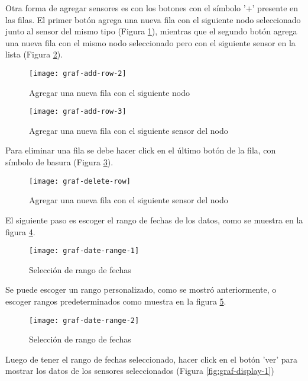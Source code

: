 Otra forma de agregar sensores es con los botones con el símbolo '+' presente en las filas. El primer botón agrega una nueva fila con el siguiente nodo seleccionado junto al sensor del mismo tipo (Figura \ref{fig:graf-add-row-2}), mientras que el segundo botón agrega una nueva fila con el mismo nodo seleccionado pero con el siguiente sensor en la lista (Figura \ref{fig:graf-add-row-3}).

\begin{figure}[H]
	\centering
	\texttt{[image: graf-add-row-2]}
	\caption{\label{fig:graf-add-row-2} Agregar una nueva fila con el siguiente nodo}
\end{figure}

\begin{figure}[H]
	\centering
	\texttt{[image: graf-add-row-3]}
	\caption{\label{fig:graf-add-row-3} Agregar una nueva fila con el siguiente sensor del nodo}
\end{figure}

Para eliminar una fila se debe hacer click en el último botón de la fila, con símbolo de basura (Figura \ref{fig:graf-delete-row}).

\begin{figure}[H]
	\centering
	\texttt{[image: graf-delete-row]}
	\caption{\label{fig:graf-delete-row} Agregar una nueva fila con el siguiente sensor del nodo}
\end{figure}

El siguiente paso es escoger el rango de fechas de los datos, como se muestra en la figura \ref{fig:graf-date-range-1}.

\begin{figure}[H]
	\centering
	\texttt{[image: graf-date-range-1]}
	\caption{\label{fig:graf-date-range-1} Selección de rango de fechas}
\end{figure}

Se puede escoger un rango personalizado, como se mostró anteriormente, o escoger rangos predeterminados como muestra en la figura \ref{fig:graf-date-range-2}.

\begin{figure}[H]
	\centering
	\texttt{[image: graf-date-range-2]}
	\caption{\label{fig:graf-date-range-2} Selección de rango de fechas}
\end{figure}

Luego de tener el rango de fechas seleccionado, hacer click en el botón 'ver' para mostrar los datos de los sensores seleccionados (Figura \ref{fig:graf-display-1})

